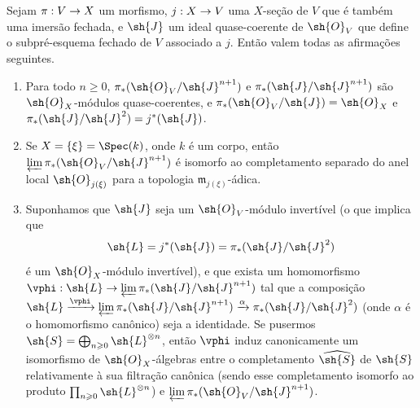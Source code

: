\documentclass[oneside,10pt]{amsart}
\makeatletter
\renewcommand{\geq}{\geqslant}
\newcommand{\ega@arrow}[2]{\mathchoice{#1}{#2}{#2}{#2}}
\renewcommand{\to}{\ega@arrow{\longrightarrow}{\rightarrow}}
\let\EGAOriginalLabel\label
\renewcommand{\label}[1]{\phantomsection\EGAOriginalLabel{#1}}
\makeatother
\begin{document}
\begin{lemma}[8.10.1]
\label{II.8.10.1}
Sejam $\pi:V\to X$ um morfismo, $j:X\to V$ uma $X$-seção de $V$ que é também uma imersão fechada, e $\sh{J}$ um ideal quase-coerente de $\sh{O}_V$ que define o subpré-esquema fechado de $V$ associado a $j$.
Então valem todas as afirmações seguintes.
\begin{enumerate}
  \item[\rm{(i)}] Para todo $n\geq0$, $\pi_*(\sh{O}_V/\sh{J}^{n+1})$ e $\pi_*(\sh{J}/\sh{J}^{n+1})$ são $\sh{O}_X$-módulos quase-coerentes, e $\pi_*(\sh{O}_V/\sh{J})=\sh{O}_X$ e $\pi_*(\sh{J}/\sh{J}^2)=j^*(\sh{J})$.
  \item[\rm{(ii)}] Se $X=\{\xi\}=\Spec(k)$, onde $k$ é um corpo, então $\varprojlim\pi_*(\sh{O}_V/\sh{J}^{n+1})$ é isomorfo ao completamento separado do anel local $\sh{O}_{j(\xi)}$ para a topologia $\mathfrak{m}_{j(\xi)}$-ádica.
  \item[\rm{(iii)}] Suponhamos que $\sh{J}$ seja um $\sh{O}_V$-módulo invertível (o que implica que
    \[
      \sh{L} = j^*(\sh{J}) = \pi_*(\sh{J}/\sh{J}^2)
    \]
    é um $\sh{O}_X$-módulo invertível), e que exista um homomorfismo $\vphi:\sh{L}\to\varprojlim\pi_*(\sh{J}/\sh{J}^{n+1})$ tal que a composição $\sh{L} \xrightarrow{\vphi} \varprojlim\pi_*(\sh{J}/\sh{J}^{n+1}) \xrightarrow{\alpha} \pi_*(\sh{J}/\sh{J}^2)$ (onde $\alpha$ é o homomorfismo canônico) seja a identidade.
    Se pusermos $\sh{S}=\bigoplus_{n\geq0}\sh{L}^{\otimes n}$, então $\vphi$ induz canonicamente um isomorfismo de $\sh{O}_X$-álgebras entre o completamento $\widehat{\sh{S}}$ de $\sh{S}$ relativamente à sua filtração canônica (sendo esse completamento isomorfo ao produto $\prod_{n\geq0}\sh{L}^{\otimes n}$) e $\varprojlim\pi_*(\sh{O}_V/\sh{J}^{n+1})$.
\end{enumerate}
\end{lemma}
\end{document}
